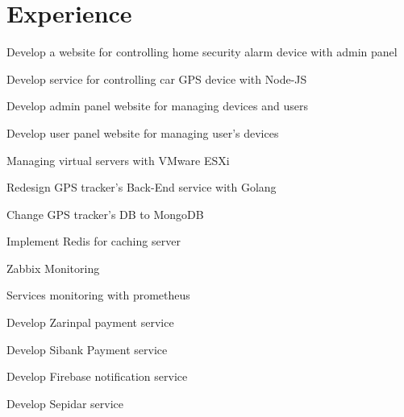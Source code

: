 \documentclass[]{deedy-resume-openfont}
\begin{document}
\begin{minipage}[t]{0.66\textwidth} 

\section{Experience}

\vspace{\topsep}
\begin{tightemize}
\item Develop a website for controlling home security alarm device with admin panel
\end{tightemize}
\sectionsep

\begin{tightemize}
\item Develop service for controlling car GPS device with Node-JS
\item Develop admin panel website for managing devices and users
\item Develop user panel website for managing user's devices
\end{tightemize}
\sectionsep

\begin{tightemize}
\item Managing virtual servers with VMware ESXi
\end{tightemize}
\sectionsep

\begin{tightemize}
\item Redesign GPS tracker's Back-End service with Golang
\item Change GPS tracker's DB to MongoDB
\item Implement Redis for caching server
\item Zabbix Monitoring
\item Services monitoring with prometheus
\end{tightemize}
\sectionsep

\begin{tightemize}
\item Develop Zarinpal payment service
\item Develop Sibank Payment service
\item Develop Firebase notification service
\item Develop Sepidar service
\end{tightemize}
\sectionsep


\end{minipage}
\end{document}
